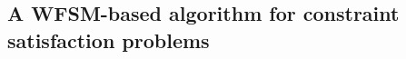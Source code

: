 \documentclass{llncs}
\newcommand{\text}[1]{\textrm{#1}}
\begin{document}





\subsection{A WFSM-based algorithm for constraint satisfaction problems}
\end{document}
